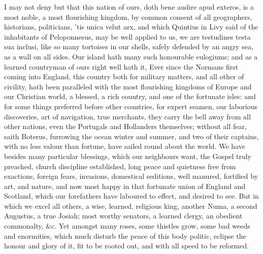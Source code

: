 {I may not deny but that this nation of ours, doth bene audire apud
exteros, is a most noble, a most flourishing kingdom, by common consent
of all geographers, historians, politicians, 'tis unica velut arx,
and which Quintius in Livy said of the inhabitants of
Peloponnesus, may be well applied to us, we are testudines testa sua
inclusi, like so many tortoises in our shells, safely defended by an
angry sea, as a wall on all sides. Our island hath many such honourable
eulogiums; and as a learned countryman of ours right well hath it,
Ever since the Normans first coming into England, this country
both for military matters, and all other of civility, hath been
paralleled with the most flourishing kingdoms of Europe and our
Christian world, a blessed, a rich country, and one of the fortunate
isles: and for some things preferred before other countries, for
expert seamen, our laborious discoveries, art of navigation, true
merchants, they carry the bell away from all other nations, even the
Portugals and Hollanders themselves; without all fear, saith
Boterus, furrowing the ocean winter and summer, and two of their
captains, with no less valour than fortune, have sailed round about the
world.  We have besides many particular blessings, which our
neighbours want, the Gospel truly preached, church discipline
established, long peace and quietness free from exactions, foreign
fears, invasions, domestical seditions, well manured, fortified by
art, and nature, and now most happy in that fortunate union of England
and Scotland, which our forefathers have laboured to effect, and
desired to see. But in which we excel all others, a wise, learned,
religious king, another Numa, a second Augustus, a true Josiah; most
worthy senators, a learned clergy, an obedient commonalty, \&c. Yet
amongst many roses, some thistles grow, some bad weeds and enormities,
which much disturb the peace of this body politic, eclipse the honour
and glory of it, fit to be rooted out, and with all speed to be
reformed.

}
